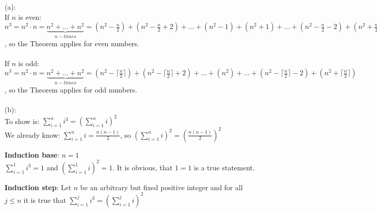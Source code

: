 
\label{ex:section1-2:8}
(a): \\
If $n$ is even: $n^3 = n^2\cdot n = \underbrace{n^2 + \ldots + n^2}_{n-times} = (n^2-\frac{n}{2}) + (n^2-\frac{n}{2}+2) + \ldots + (n^2-1) + (n^2+1) + \ldots + (n^2-\frac{n}{2}-2) + (n^2 + \frac{n}{2})$, so the Theorem applies for even numbers. \\ \\
If $n$ is odd: $n^3 = n^2\cdot n = \underbrace{n^2 + \ldots + n^2}_{n-times} = (n^2-\lceil\frac{n}{2}\rceil) + (n^2-\lceil\frac{n}{2}\rceil+2) + \ldots + (n^2) + \ldots + (n^2-\lceil\frac{n}{2}\rceil-2) + (n^2 + \lceil\frac{n}{2}\rceil)$, so the Theorem applies for odd numbers. \\ \\

(b): \\
To show is: $\sum_{i = 1}^n i^3 = \left(\sum_{i=1}^{n} i \right)^2$ \\
We already know: $\sum_{i=1}^{n} i = \frac{n(n-1)}{2}$, so $\left(\sum_{i=1}^{n} i \right)^2 = \left( \frac{n(n-1)}{2}\right)^2$

\textbf{Induction base}: $n = 1$ \\
$\sum_{i = 1}^1 i^3 = 1$ and $\left(\sum_{i = 1}^1 i\right)^2 = 1$.
It is obvious, that $1=1$ is a true statement.


\textbf{Induction step}: Let $n$ be an arbitrary but fixed positive integer and for all $j \leq n$ it is true that $\sum_{i = 1}^j i^3 = \left(\sum_{i=1}^{j} i \right)^2$

